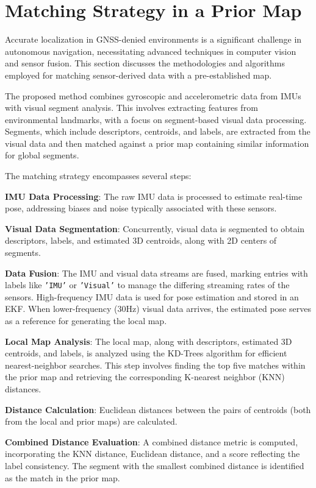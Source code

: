 \section{Matching Strategy in a Prior Map}

Accurate localization in GNSS-denied environments is a significant challenge in autonomous navigation, necessitating advanced techniques in computer vision and sensor fusion. This section discusses the methodologies and algorithms employed for matching sensor-derived data with a pre-established map.

The proposed method combines gyroscopic and accelerometric data from IMUs with visual segment analysis. This involves extracting features from environmental landmarks, with a focus on segment-based visual data processing. Segments, which include descriptors, centroids, and labels, are extracted from the visual data and then matched against a prior map containing similar information for global segments.

The matching strategy encompasses several steps:

\textbf{IMU Data Processing}: The raw IMU data is processed to estimate real-time pose, addressing biases and noise typically associated with these sensors.

\textbf{Visual Data Segmentation}: Concurrently, visual data is segmented to obtain descriptors, labels, and estimated 3D centroids, along with 2D centers of segments.

\textbf{Data Fusion}: The IMU and visual data streams are fused, marking entries with labels like \texttt{'IMU'} or \texttt{'Visual'} to manage the differing streaming rates of the sensors. High-frequency IMU data is used for pose estimation and stored in an EKF. When lower-frequency (30Hz) visual data arrives, the estimated pose serves as a reference for generating the local map.

\textbf{Local Map Analysis}: The local map, along with descriptors, estimated 3D centroids, and labels, is analyzed using the KD-Trees algorithm for efficient nearest-neighbor searches. This step involves finding the top five matches within the prior map and retrieving the corresponding K-nearest neighbor (KNN) distances.

\textbf{Distance Calculation}: Euclidean distances between the pairs of centroids (both from the local and prior maps) are calculated.

\textbf{Combined Distance Evaluation}: A combined distance metric is computed, incorporating the KNN distance, Euclidean distance, and a score reflecting the label consistency. The segment with the smallest combined distance is identified as the match in the prior map.

